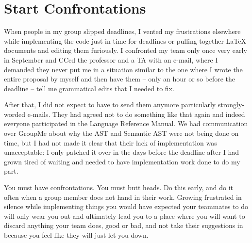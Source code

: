 \section{Start Confrontations}
When people in my group slipped deadlines, I vented my frustrations elsewhere while implementing the code just in time for deadlines or pulling together LaTeX documents and editing them furiously. I confronted my team only once very early in September and CCed the professor and a TA with an e-mail, where I demanded they never put me in a situation similar to the one where I wrote the entire \lepix{} proposal by myself and then have them -- only an hour or so before the deadline -- tell me grammatical edits that I needed to fix.

After that, I did not expect to have to send them anymore particularly strongly-worded e-mails. They had agreed not to do something like that again and indeed everyone participated in the Language Reference Manual. We had communication over GroupMe about why the AST and Semantic AST were not being done on time, but I had not made it clear that their lack of implementation was unacceptable: I only patched it over in the days before the deadline after I had grown tired of waiting and needed to have implementation work done to do my part.

You must have confrontations. You must butt heads. Do this early, and do it often when a group member does not hand in their work. Growing frustrated in silence while implementing things you would have expected your teammates to do will only wear you out and ultimately lead you to a place where you will want to discard anything your team does, good or bad, and not take their suggestions in because you feel like they will just let you down.